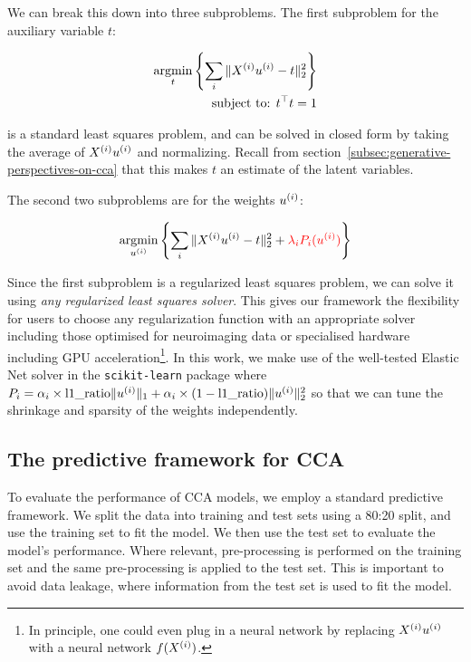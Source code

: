 We can break this down into three subproblems.
The first subproblem for the auxiliary variable \(t\):

\begin{align}
    \underset{t}{\mathrm{argmin}}\left\{\sum_i \|X^{(i)} u^{(i)} - t\|_2^2\right\}\\
    \text{subject to: }t^\top t = 1\\
\end{align}

is a standard least squares problem, and can be solved in closed form by taking the average of $X^{(i)} u^{(i)}$ and normalizing.
Recall from section~\ref{subsec:generative-perspectives-on-cca} that this makes $t$ an estimate of the latent variables.

The second two subproblems are for the weights \(u^{(i)}\):

\begin{align}
    \underset{u^{(i)}}{\mathrm{argmin}}\left\{\sum_i \|X^{(i)} u^{(i)} - t\|_2^2 + \textcolor{red}{\lambda_i P_i(u^{(i)})} \right\}\\
\end{align}

Since the first subproblem is a regularized least squares problem, we can solve it using \textit{any regularized least squares solver}.
This gives our framework the flexibility for users to choose any regularization function with an appropriate solver including those optimised for neuroimaging data\citep{Nilearn_contributors_Nilearn} or specialised hardware including GPU acceleration\footnote{In principle, one could even plug in a neural network by replacing $X^{(i)} u^{(i)}$ with a neural network $f(X^{(i)})$.}.
In this work, we make use of the well-tested Elastic Net solver in the \texttt{scikit-learn} package \citep{pedregosa2011scikit} where $P_i=\alpha_i \times \text{l1\_ratio} \|u^{(i)}\|_1 + \alpha_i \times (1-\text{l1\_ratio}) \|u^{(i)}\|^2_2$ so that we can tune the shrinkage and sparsity of the weights independently.

\subsection{The predictive framework for CCA}

To evaluate the performance of CCA models, we employ a standard predictive framework.
We split the data into training and test sets using a 80:20 split, and use the training set to fit the model.
We then use the test set to evaluate the model's performance.
Where relevant, pre-processing is performed on the training set and the same pre-processing is applied to the test set.
This is important to avoid data leakage, where information from the test set is used to fit the model.

